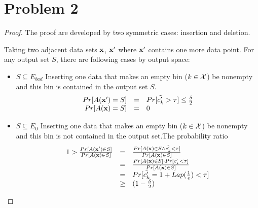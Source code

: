 \documentclass[11pt]{article}
\begin{document}
\section{Problem 2}
\begin{proof}
The proof are developed by two symmetric cases: insertion and deletion.
%
\begin{itemize}
Taking two adjacent data sets $\mathbf{x}$, $\mathbf{x}'$ where $\mathbf{x}'$ contains one more data point.
For any output set $S$, there are following cases by output space:
\begin{itemize} 
\item $S \subseteq E_{bad}$ Inserting one data that makes an empty bin ($k \in \mathcal{X}$) be nonempty and this bin is contained in the output set $S$.
\[
	\begin{array}{rcl}
	Pr[A(\mathbf{x}') = S]
	& = & 
	Pr[\tilde{c'_k} > \tau ] \leq \frac{\delta}{2}\\
	Pr[A(\mathbf{x}) = S]
	& = & 0
	\end{array}
\]
\item $S \subseteq E_{0}$ Inserting one data that makes an empty bin ($k \in \mathcal{X}$) be nonempty and this bin is not contained in the output set.The probability ratio 
%
\[
	\begin{array}{rcl}
	1 > \frac{Pr[A(\mathbf{x}') \in S]}
	{Pr[A(\mathbf{x}) \in S]}
	& = & 
	\frac{ Pr[A(\mathbf{x}) \in S \land \tilde{c'_k} < \tau ] }
	{Pr[A(\mathbf{x}) \in S]}\\
	& = &
	\frac{Pr[A(\mathbf{x}) \in S] \cdot Pr[ \tilde{c'_k} < \tau ] }
	{Pr[A(\mathbf{x}) \in S]}\\
	& = & 
	Pr[ \tilde{c'_k} = 1 + Lap(\frac{1}{\epsilon}) < \tau]\\
	& \geq &
	(1 - \frac{\delta}{2})
	\end{array}
\]


\end{itemize}
\end{itemize}
\end{proof}
\end{document}
